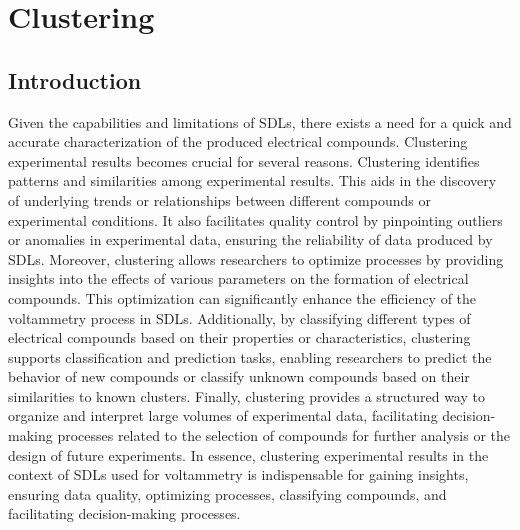 \chapter{Clustering} \label{chap:chap-2}







\section{Introduction}
Given the capabilities and limitations of SDLs, there exists a need for a quick and accurate characterization of the produced electrical compounds. Clustering experimental results becomes crucial for several reasons. 
Clustering identifies patterns and similarities among experimental results. This aids in the discovery of underlying trends or relationships between different compounds or experimental conditions. It also facilitates quality control by pinpointing outliers or anomalies in experimental data, ensuring the reliability of data produced by SDLs. 
Moreover, clustering allows researchers to optimize processes by providing insights into the effects of various parameters on the formation of electrical compounds. This optimization can significantly enhance the efficiency of the voltammetry process in SDLs. Additionally, by classifying different types of electrical compounds based on their properties or characteristics, clustering supports classification and prediction tasks, enabling researchers to predict the behavior of new compounds or classify unknown compounds based on their similarities to known clusters.
Finally, clustering provides a structured way to organize and interpret large volumes of experimental data, facilitating decision-making processes related to the selection of compounds for further analysis or the design of future experiments. In essence, clustering experimental results in the context of SDLs used for voltammetry is indispensable for gaining insights, ensuring data quality, optimizing processes, classifying compounds, and facilitating decision-making processes.
